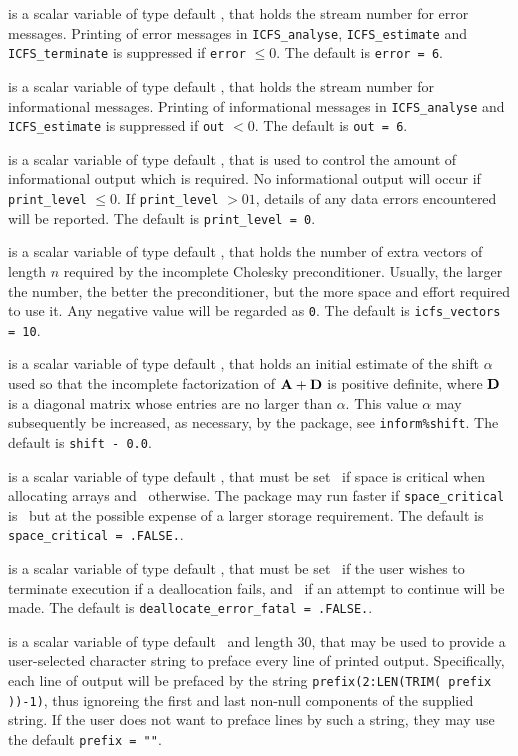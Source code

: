 \documentclass{galahad}
\newcommand{\packagename}{ICFS}
\begin{document}
\begin{description}

 is a scalar variable of type default \integer, that holds the
stream number for error messages. Printing of error messages in 
{\tt \packagename\_analyse},
{\tt \packagename\_estimate} 
and {\tt \packagename\_terminate} 
is suppressed if {\tt error} $\leq 0$.
The default is {\tt error = 6}.

 is a scalar variable of type default \integer, that holds the
stream number for informational messages. Printing of informational messages in 
{\tt \packagename\_analyse} and {\tt \packagename\_estimate} 
is suppressed if {\tt out} $< 0$.
The default is {\tt out = 6}.

 is a scalar variable of type default \integer, that is used
to control the amount of informational output which is required. No 
informational output will occur if {\tt print\_level} $\leq 0$. If 
{\tt print\_level} $> 01$, details of any data errors encountered 
will be reported.
The default is {\tt print\_level = 0}.

 is a scalar variable of type default \integer, that holds
the number of extra vectors of length $n$ required by the
incomplete Cholesky preconditioner.
Usually, the larger the number, the
better the preconditioner, but the more space and effort required to
use it. Any negative value will be regarded as {\tt 0}.
The default is {\tt icfs\_vectors = 10}.

 is a scalar variable of type default \realdp, that holds
an initial estimate of the shift $\alpha$ used so that the incomplete 
factorization of ${\mathbf{A}} + {\mathbf{D}}$ is positive definite, where ${\mathbf{D}}$ is
a diagonal matrix whose entries are no larger than $\alpha$.
This value $\alpha$ may subsequently be increased, as necessary, by the 
package, see {\tt inform\%shift}.
The default is {\tt shift - 0.0}.

 is a scalar variable of type default \logical, 
that must be set \true\ if space is critical when allocating arrays
and  \false\ otherwise. The package may run faster if 
{\tt space\_critical} is \false\ but at the possible expense of a larger
storage requirement. The default is {\tt space\_critical = .FALSE.}.

 is a scalar variable of type default \logical, 
that must be set \true\ if the user wishes to terminate execution if
a deallocation  fails, and \false\ if an attempt to continue
will be made. The default is {\tt deallocate\_error\_fatal = .FALSE.}.

 is a scalar variable of type default \character\
and length 30, that may be used to provide a user-selected 
character string to preface every line of printed output. 
Specifically, each line of output will be prefaced by the string 
{\tt prefix(2:LEN(TRIM( prefix ))-1)},
thus ignoreing the first and last non-null components of the
supplied string. If the user does not want to preface lines by such
a string, they may use the default {\tt prefix = ""}.

\end{description}
\end{document}
